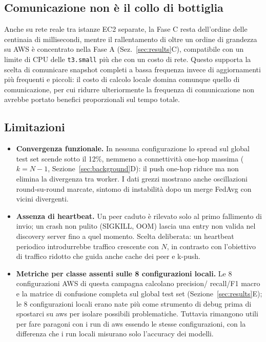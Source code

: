 \subsection{Comunicazione non è il collo di bottiglia}
Anche su rete reale tra istanze EC2 separate, la Fase C resta dell'ordine
delle centinaia di millisecondi, mentre il rallentamento di oltre un ordine
di grandezza su AWS è concentrato nella Fase A (Sez.~\ref{sec:results}C),
compatibile con un limite di CPU delle \texttt{t3.small} più che
con un costo di rete. Questo supporta la scelta di comunicare snapshot
completi a bassa frequenza invece di aggiornamenti più frequenti e piccoli:
il costo di calcolo locale domina comunque quello di comunicazione, per cui
ridurre ulteriormente la frequenza di comunicazione non avrebbe portato benefici
proporzionali sul tempo totale.

\subsection{Limitazioni}
\begin{itemize}
  \item \textbf{Convergenza funzionale.} In nessuna configurazione
        lo spread sul global test set scende sotto il 12\%, nemmeno a
        connettività one-hop massima ($k=N-1$, Sezione~\ref{sec:background}D):
        il push one-hop riduce ma non elimina la divergenza tra worker. I dati
        grezzi mostrano anche oscillazioni round-su-round marcate, sintomo di instabilità dopo
        un merge FedAvg con vicini divergenti.
  \item \textbf{Assenza di heartbeat.} Un peer caduto è rilevato solo al
        primo fallimento di invio; un crash non pulito (SIGKILL, OOM) lascia
        una entry non valida nel discovery server fino a quel momento. Scelta
        deliberata: un heartbeat periodico introdurrebbe traffico crescente
        con $N$, in contrasto con l'obiettivo di traffico ridotto che guida
        anche cache dei peer e k-push.
  \item \textbf{Metriche per classe assenti sulle 8 configurazioni locali.}
        Le 8 configurazioni AWS di questa campagna calcolano precision/
        recall/F1 macro e la matrice di confusione completa sul global test
        set (Sezione~\ref{sec:results}E); le 8 configurazioni locali erano nate più come
        strumento di debug prima di spostarci su aws per isolare possibili problematiche. Tuttavia rimangono
        utili per fare paragoni con i run di aws essendo le stesse configurazioni, con la differenza che i run locali
        misurano solo l'accuracy dei modelli.
\end{itemize}

